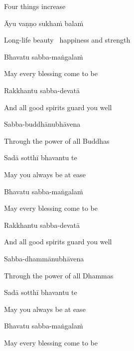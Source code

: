 \begin{english}
  Four things increase
\end{english}

Āyu vaṇṇo sukhaṁ balaṁ

\begin{english}
  Long-life beauty \breathmark\ happiness and strength
\end{english}

Bhavatu sabba-maṅgalaṁ

\begin{english}
  May every blessing come to be
\end{english}

Rakkhantu sabba-devatā

\begin{english}
  And all good spirits guard you well
\end{english}

Sabba-buddhānubhāvena

\begin{english}
  Through the power of all Buddhas
\end{english}

Sadā sotthī bhavantu te

\begin{english}
  May you always be at ease
\end{english}

Bhavatu sabba-maṅgalaṁ

\begin{english}
  May every blessing come to be
\end{english}

Rakkhantu sabba-devatā

\begin{english}
  And all good spirits guard you well
\end{english}

Sabba-dhammānubhāvena

\begin{english}
  Through the power of all Dhammas
\end{english}

Sadā sotthī bhavantu te

\begin{english}
  May you always be at ease
\end{english}

Bhavatu sabba-maṅgalaṁ

\begin{english}
  May every blessing come to be
\end{english}

